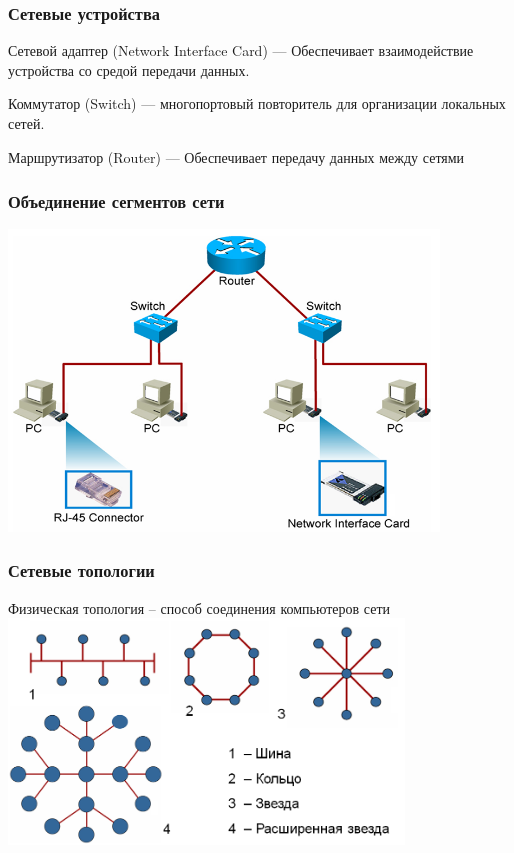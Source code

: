 \begin{frame}[t]
\frametitle{Сетевые устройства}
Сетевой адаптер (Network Interface Card) --- Обеспечивает взаимодействие устройства со средой передачи данных.

Коммутатор (Switch) --- многопортовый повторитель для организации локальных сетей.

Маршрутизатор (Router) --- Обеспечивает передачу данных между сетями


\end{frame}



\begin{frame}[t]
\frametitle{Объединение сегментов сети}
\includegraphics[height=8cm]{images/it_1}

\end{frame}


\begin{frame}[t]
\frametitle{Сетевые топологии }
Физическая топология – способ соединения компьютеров сети
\includegraphics[height=6cm]{images/it_2}


\end{frame}

